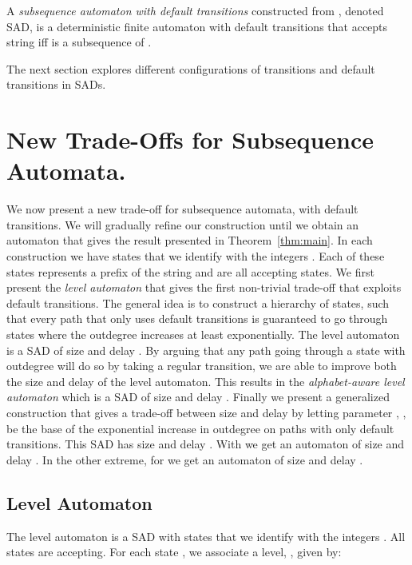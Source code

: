 \documentclass[a4paper,11pt]{article}
\begin{document}
A \emph{subsequence automaton with default transitions} constructed from , denoted SAD, is a deterministic finite automaton with default transitions that accepts string  iff  is a subsequence of . 

The next section explores different configurations of transitions and default transitions in SADs.















\section{New Trade-Offs for Subsequence Automata.}
We now present a new trade-off for subsequence automata, with default transitions. We will gradually refine our construction until we obtain an automaton that gives the result presented in Theorem~\ref{thm:main}. In each construction we have  states that we identify with the integers . Each of these states represents a prefix of the string  and are all accepting states.
We first present the \emph{level automaton} that gives the first non-trivial trade-off that exploits default transitions. 
The general idea is to construct a hierarchy of states, such that every path that only uses default transitions is guaranteed to go through states where the outdegree increases at least exponentially.
The level automaton is a SAD of size  and delay . 
By arguing that any path going through a state with outdegree  will do so by taking a regular transition, we are able to improve both the size and delay of the level automaton. 
This results in the \emph{alphabet-aware level automaton} which is a SAD of size  and delay . Finally we present a generalized  construction that gives a trade-off between size and delay by letting parameter , , be the base of the exponential increase in outdegree on paths with only default transitions. This SAD has size  and delay . With  we get an automaton of size  and delay . In the other extreme, for  we get an automaton of size  and delay .
\subsection{Level Automaton}
The level automaton is a SAD with  states that we identify with the integers . All states are accepting. For each state , we associate a level, , given by:
\end{document}
